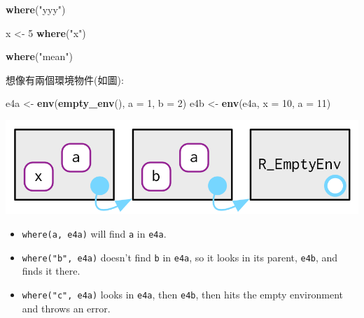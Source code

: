 \documentclass[]{book}
\newenvironment{Shaded}{\begin{snugshade}}{\end{snugshade}}
\newcommand{\KeywordTok}[1]{\textcolor[rgb]{0.13,0.29,0.53}{\textbf{#1}}}
\newcommand{\DataTypeTok}[1]{\textcolor[rgb]{0.13,0.29,0.53}{#1}}
\newcommand{\DecValTok}[1]{\textcolor[rgb]{0.00,0.00,0.81}{#1}}
\newcommand{\StringTok}[1]{\textcolor[rgb]{0.31,0.60,0.02}{#1}}
\newcommand{\NormalTok}[1]{#1}
\theoremstyle{definition}
\theoremstyle{definition}
\theoremstyle{definition}
\theoremstyle{remark}
\begin{document}
\begin{Shaded}
\begin{Highlighting}[]
\KeywordTok{where}\NormalTok{(}\StringTok{"yyy"}\NormalTok{)}
\end{Highlighting}
\end{Shaded}

\begin{Shaded}
\begin{Highlighting}[]
\NormalTok{x <-}\StringTok{ }\DecValTok{5}
\KeywordTok{where}\NormalTok{(}\StringTok{"x"}\NormalTok{)}
\end{Highlighting}
\end{Shaded}

\begin{Shaded}
\begin{Highlighting}[]
\KeywordTok{where}\NormalTok{(}\StringTok{"mean"}\NormalTok{)}
\end{Highlighting}
\end{Shaded}

想像有兩個環境物件(如圖):

\begin{Shaded}
\begin{Highlighting}[]
\NormalTok{e4a <-}\StringTok{ }\KeywordTok{env}\NormalTok{(}\KeywordTok{empty_env}\NormalTok{(), }\DataTypeTok{a =} \DecValTok{1}\NormalTok{, }\DataTypeTok{b =} \DecValTok{2}\NormalTok{)}
\NormalTok{e4b <-}\StringTok{ }\KeywordTok{env}\NormalTok{(e4a, }\DataTypeTok{x =} \DecValTok{10}\NormalTok{, }\DataTypeTok{a =} \DecValTok{11}\NormalTok{)}
\end{Highlighting}
\end{Shaded}

\begin{center}\includegraphics{diagrams/environments/where-ex} \end{center}

\begin{itemize}
\item
  \texttt{where(a,\ e4a)} will find \texttt{a} in \texttt{e4a}.
\item
  \texttt{where("b",\ e4a)} doesn't find \texttt{b} in \texttt{e4a}, so
  it looks in its parent, \texttt{e4b}, and finds it there.
\item
  \texttt{where("c",\ e4a)} looks in \texttt{e4a}, then \texttt{e4b},
  then hits the empty environment and throws an error.
\end{itemize}
\end{document}
